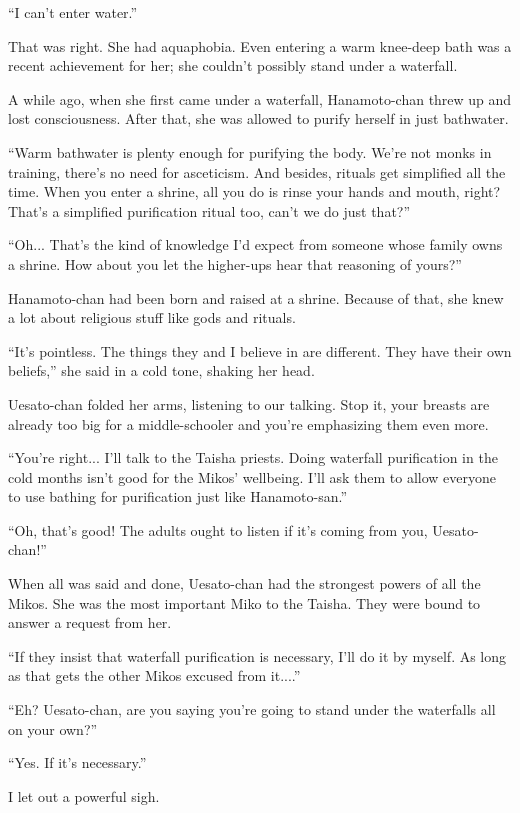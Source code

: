 ``I can't enter water.''

That was right. She had aquaphobia. Even entering a warm knee-deep bath was a recent achievement for her; she couldn't possibly stand under a waterfall.

A while ago, when she first came under a waterfall, Hanamoto-chan threw up and lost consciousness. After that, she was allowed to purify herself in just bathwater.

``Warm bathwater is plenty enough for purifying the body. We're not monks in training, there's no need for asceticism. And besides, rituals get simplified all the time. When you enter a shrine, all you do is rinse your hands and mouth, right? That's a simplified purification ritual too, can't we do just that?''

``Oh... That's the kind of knowledge I'd expect from someone whose family owns a shrine. How about you let the higher-ups hear that reasoning of yours?''

Hanamoto-chan had been born and raised at a shrine. Because of that, she knew a lot about religious stuff like gods and rituals.

``It's pointless. The things they and I believe in are different. They have their own beliefs,'' she said in a cold tone, shaking her head.

Uesato-chan folded her arms, listening to our talking. Stop it, your breasts are already too big for a middle-schooler and you're emphasizing them even more.

``You're right... I'll talk to the Taisha priests. Doing waterfall purification in the cold months isn't good for the Mikos' wellbeing. I'll ask them to allow everyone to use bathing for purification just like Hanamoto-san.''

``Oh, that's good! The adults ought to listen if it's coming from you, Uesato-chan!''

When all was said and done, Uesato-chan had the strongest powers of all the Mikos. She was the most important Miko to the Taisha. They were bound to answer a request from her.

``If they insist that waterfall purification is necessary, I'll do it by myself. As long as that gets the other Mikos excused from it....''

``Eh? Uesato-chan, are you saying you're going to stand under the waterfalls all on your own?''

``Yes. If it's necessary.''

I let out a powerful sigh.

